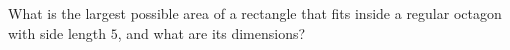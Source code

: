 What is the largest possible area of a rectangle that fits inside a regular octagon with side length $5$, and what are its dimensions?
